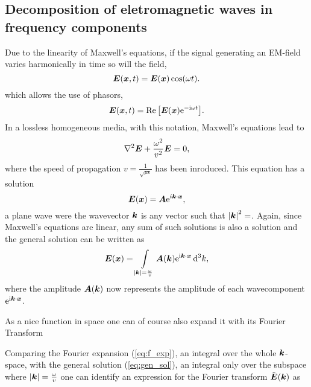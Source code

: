 \documentclass[11pt,a4paper, 
english, swedish %
]{article}
\begin{document}
\subsection{Decomposition of eletromagnetic waves in frequency components}

Due to the linearity of Maxwell's equations, if the signal generating an EM-field varies harmonically in time so will the field,
\begin{equation*}
\vb*E(\vb*x,t)=\vb*E(\vb*x)\cos(\omega t).
\end{equation*}
which allows the use of phasors,
\begin{equation*}
\vb*E(\vb*x,t)=\Re\qty[\vb*E(\vb*x)\mathrm{e}^{-\mathrm{i}\omega t}].
\end{equation*}
In a lossless homogeneous media, with this notation, Maxwell's equations lead to
\begin{equation}
  \label{eq:wave_free}
  \laplacian  \vb*E + \frac{\omega^2}{v^2}\vb*E=0,
\end{equation} 
where the speed of propagation $v=\frac{1}{\sqrt{\mu \epsilon}}$ has been inroduced. This equation has a solution
\begin{equation*}
\vb*E(\vb*x)=\vb*A\mathrm{e}^{i\vb*k \cdot \vb*x},
\end{equation*}
a plane wave were the wavevector $\vb*k$ is any vector such that $\abs{\vb*k}^2=$. Again, since Maxwell's equations are linear, any sum of such solutions is also a solution and the general solution can be written as
\begin{equation}
  \label{eq:gen_sol}
  \vb*E(\vb*x)=\int_{\abs{\vb*k}=\frac{\omega}{v}}\vb*A(\vb*k)\ee^{\ii\vb*k\cdot\vb*x}\id^3k,
\end{equation}
where the amplitude $\vb*A(\vb*k)$ now represents the amplitude of each wavecomponent $\mathrm{e}^{\mathrm{i}\vb*k \cdot \vb*x}$.

As a nice function in space one can of course also expand it with its Fourier Transform


Comparing the Fourier expansion (\ref{eq:f_exp}), an integral over the whole $\vb*k$-space, with the general solution (\ref{eq:gen_sol}), an integral only over the subspace where $\abs{\vb*k}=\frac{\omega}{v}$ one can identify an expression for the Fourier transform $\tilde{\vb*E}(\vb*k)$ as
\end{document}
